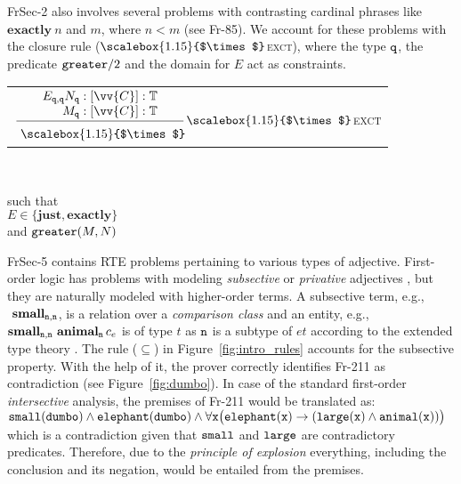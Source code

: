 \documentclass[11pt]{article}
\makeatletter
\newcommand{\btimes}{\scalebox{1.15}{$\times$}\kern-1.5pt}
\newcommand{\rulen}[1]{{\normalfont\textsc{#1}}}
\newcommand{\semt}[1]{\tt #1}
\newcommand{\synt}[1]{\textbf{#1}}
\newcommand{\T}{\mathbb{T}}
\newcommand{\nou}{{\tt n}}
\newcommand{\qu}{{\tt q}}
\newcommand{\nonBranchingRule}[3][]{
\begin{tabular}{@{}c@{}}
$\dfrac{
	\begin{tabular}{@{}r@{}}
			#2
	\end{tabular}}
{
	\raisebox{-4pt}{
		\begin{tabular}[t]{@{}r@{}}
   			#3
	\end{tabular}}
}$#1
\end{tabular}}
\makeatother
\begin{document}
FrSec-2 also involves several problems with contrasting cardinal phrases like $\synt{exactly}~n$ and $m$, where $n < m$ (see Fr-85).
We account for these problems with the closure rule ($\btimes$\,\rulen{exct}), where the type $\qu$, the predicate ${\tt greater}/2$ and the domain for $E$ act as constraints.

\begin{center}
\nonBranchingRule[$\btimes$\,\rulen{exct}]
{$E_{\qu,\qu} N_\qu : [\vv{C}] : \T$\\
 $M_\qu   : [\vv{C}] : \T$}
{$\btimes$}
~
\parbox{35mm}{such that\\
$E \in \{\synt{just}, \synt{exactly}\}$
\\and ${\tt greater}(M,N)$
}
\end{center}


FrSec-5 contains RTE problems pertaining to various types of adjective.   
First-order logic has problems with modeling {\em subsective} or {\em privative} adjectives \cite{Kamp-partee:1995}, but they are naturally modeled with higher-order terms.
A subsective term, e.g., $\synt{ small}_{\nou,\nou}$, is a relation over a {\em comparison class} and an entity, e.g., $\synt{small}_{\nou,\nou}~\synt{animal}_\nou\,c_e$ is of type $t$ as $\nou$ is a subtype of $et$ according to the extended type theory \cite{abzianidze:2015:LENLS}.
The rule ($\subseteq$) in Figure~\ref{fig:intro_rules} accounts for the subsective property.
With the help of it, the prover correctly identifies Fr-211 as contradiction (see Figure~\ref{fig:dumbo}).
In case of the standard first-order {\em intersective} analysis, the premises of Fr-211 would be translated as:
\\[2mm]
$\semt{small}(\semt{dumbo}) \wedge \semt{elephant}(\semt{dumbo}) \wedge\\ \forall x\big(\semt{elephant}(x) \to (\semt{large}(x) \wedge \semt{animal}(x))\big)$
\\[2mm]
which is a contradiction given that $\semt{small}$ and $\semt{large}$ are contradictory predicates.
Therefore, due to the {\em principle of explosion} everything, including the conclusion and its negation, would be entailed from the premises. 
\end{document}
